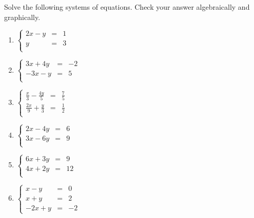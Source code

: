 \begin{ex} \label{reviewsubelim}  Solve the following systems of equations.  Check your answer algebraically and graphically.

\begin{multicols}{3}

\begin{enumerate}

\item  $\left\{ \begin{array}{rcr} 2x - y & = & 1 \\ y & = & 3 \\ \end{array} \right.$

\item  $\left\{ \begin{array}{rcr} 3x+4y & = & -2  \\ -3x-y & = & 5 \\ \end{array} \right.$

\item  $\left\{ \begin{array}{rcr} \frac{x}{3} -\frac{4y}{5} & = & \frac{7}{5} \\ [3pt] 
\frac{2x}{9} + \frac{y}{3} & = & \frac{1}{2} \\ \end{array} \right.$

\item  $\left\{ \begin{array}{rcr} 2x - 4y & = & 6 \\ 3x -6y & = & 9\\ \end{array} \right.$

\item  $\left\{ \begin{array}{rcr} 6x + 3y & = & 9 \\ 4x + 2y & = & 12 \\ \end{array} \right.$

\item   $\left\{ \begin{array}{rcr} x - y & = & 0 \\ x + y & = & 2 \\ -2x + y & = & -2 \end{array} \right.$


\end{enumerate}

\end{multicols}


\end{ex}
